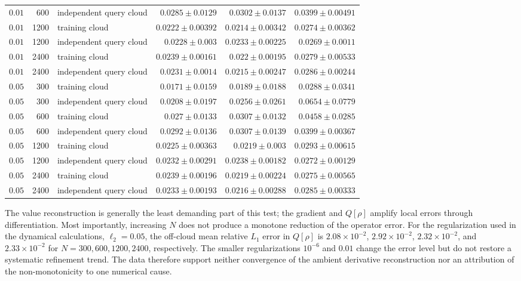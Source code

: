 \begin{longtable}{r r L{0.25\textwidth} r r r}
$0.01$ & 600 & independent query cloud & $0.0285\pm 0.0129$ & $0.0302\pm 0.0137$ & $0.0399\pm 0.00491$ \\
$0.01$ & 1200 & training cloud & $0.0222\pm 0.00392$ & $0.0214\pm 0.00342$ & $0.0274\pm 0.00362$ \\
$0.01$ & 1200 & independent query cloud & $0.0228\pm 0.003$ & $0.0233\pm 0.00225$ & $0.0269\pm 0.0011$ \\
$0.01$ & 2400 & training cloud & $0.0239\pm 0.00161$ & $0.022\pm 0.00195$ & $0.0279\pm 0.00533$ \\
$0.01$ & 2400 & independent query cloud & $0.0231\pm 0.0014$ & $0.0215\pm 0.00247$ & $0.0286\pm 0.00244$ \\
$0.05$ & 300 & training cloud & $0.0171\pm 0.0159$ & $0.0189\pm 0.0188$ & $0.0288\pm 0.0341$ \\
$0.05$ & 300 & independent query cloud & $0.0208\pm 0.0197$ & $0.0256\pm 0.0261$ & $0.0654\pm 0.0779$ \\
$0.05$ & 600 & training cloud & $0.027\pm 0.0133$ & $0.0307\pm 0.0132$ & $0.0458\pm 0.0285$ \\
$0.05$ & 600 & independent query cloud & $0.0292\pm 0.0136$ & $0.0307\pm 0.0139$ & $0.0399\pm 0.00367$ \\
$0.05$ & 1200 & training cloud & $0.0225\pm 0.00363$ & $0.0219\pm 0.003$ & $0.0293\pm 0.00615$ \\
$0.05$ & 1200 & independent query cloud & $0.0232\pm 0.00291$ & $0.0238\pm 0.00182$ & $0.0272\pm 0.00129$ \\
$0.05$ & 2400 & training cloud & $0.0239\pm 0.00196$ & $0.0219\pm 0.00224$ & $0.0275\pm 0.00565$ \\
$0.05$ & 2400 & independent query cloud & $0.0233\pm 0.00193$ & $0.0216\pm 0.00288$ & $0.0285\pm 0.00333$ \\
\end{longtable}
\endgroup

The value reconstruction is generally the least demanding part of this test;
the gradient and \(Q[\rho]\) amplify local errors through differentiation.
Most importantly, increasing \(N\) does not produce a monotone reduction of
the operator error. For the regularization used in the dynamical calculations,
\(\ell_2=0.05\), the off-cloud mean relative \(L_1\) error in \(Q[\rho]\) is
\(2.08\times10^{-2}\), \(2.92\times10^{-2}\),
\(2.32\times10^{-2}\), and \(2.33\times10^{-2}\) for
\(N=300,600,1200,2400\), respectively. The smaller regularizations
\(10^{-6}\) and \(0.01\) change the error level but do not restore a systematic
refinement trend. The data therefore support neither convergence of the
ambient derivative reconstruction nor an attribution of the non-monotonicity
to one numerical cause.


